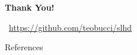 \documentclass[aspectratio=169,xcolor=dvipsnames]{beamer}
\begin{document}



\begin{frame}
    \Huge{\centerline{\textbf{Thank You!}}}
    \begin{center}
    {\normalsize
    \faGithub\ \url{https://github.com/teobucci/slhd}}    
    \end{center}
\end{frame}


\begin{frame}{References}
    \nocite{Bragazzi2021Burden}
    \nocite{Groenewegen2020Epidemiology}
    \nocite{Zhang2021Electronic}
    \nocite{Lonn2000Regular}
    \printbibliography
\end{frame}



\end{document}
